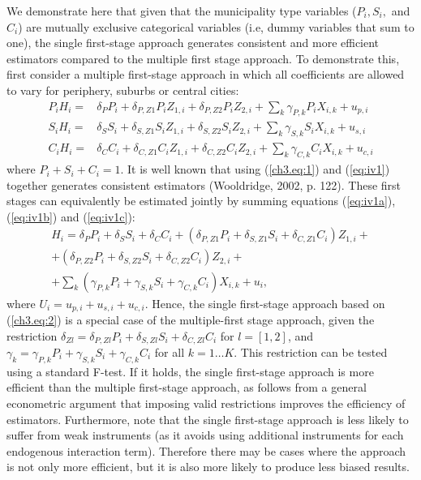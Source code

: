 \documentclass[a4paper,authoryear,review]{elsarticle}  	%
\begin{document}
	We demonstrate here that given that the municipality type variables ($P_{i}, S_{i},$ and $C_{i}$) are mutually exclusive categorical variables (i.e, dummy variables that sum to one), the single first-stage approach generates consistent and more efficient estimators compared to the multiple first stage approach. 	
	To demonstrate this, first consider a multiple first-stage approach in which all coefficients are allowed to vary for periphery, suburbs or central cities: 	
	\begin{subequations}\label{eq:iv1}
		\begin{eqnarray}
		P_{i}H_{i}=&\delta_{P}P_{i} + \delta_{P,Z1}P_{i}Z_{1,i}+ \delta_{P,Z2}P_{i}Z_{2,i} + \sum_{k}\gamma_{P,k} P_{i}X_{i,k} + u_{p,i} \label{eq:iv1a} \\
		S_{i}H_{i}=&\delta_{S}S_{i} + \delta_{S,Z1}S_{i}Z_{1,i}+ \delta_{S,Z2}S_{i}Z_{2,i} + \sum_{k}\gamma_{S,k} S_{i}X_{i,k} + u_{s,i} \label{eq:iv1b} \\
		C_{i}H_{i}=&\delta_{C}C_{i} + \delta_{C,Z1}C_{i}Z_{1,i}+ \delta_{C,Z2}C_{i}Z_{2,i} + \sum_{k}\gamma_{C,k} C_{i}X_{i,k} + u_{c,i} \label{eq:iv1c}			
		\end{eqnarray}
	\end{subequations}
	where $P_{i} + S_{i} + C_{i} = 1$. 
	It is well known that using (\ref{ch3.eq:1}) and (\ref{eq:iv1}) together generates consistent estimators (Wooldridge, 2002, p. 122). %
	These first stages can equivalently be estimated jointly by summing equations (\ref{eq:iv1a}), (\ref{eq:iv1b}) and (\ref{eq:iv1c}):	
	\begin{equation}\label{eq:iv2}
	\begin{split}
	H_{i} =	 \delta_{P}P_{i} + \delta_{S}S_{i} + \delta_{C}C_{i} + 	(\delta_{P,Z1}P_{i} + \delta_{S,Z1}S_{i} + \delta_{C,Z1}C_{i})Z_{1,i} + \\
	+ (\delta_{P,Z2}P_{i} + \delta_{S,Z2}S_{i} + \delta_{C,Z2}C_{i})Z_{2,i} + \\
	+ \sum_{k} (\gamma_{P,k}P_{i} + \gamma_{S,k}S_{i} + \gamma_{C,k}C_{i}) X_{i,k} + u_i ,
	\end{split}
	\end{equation}
	where  $U_i = u_{p,i} + u_{s,i} + u_{c,i}$. Hence, the single first-stage approach based on (\ref{ch3.eq:2}) is a special case of the multiple-first stage approach, given the restriction $\delta_{Zl} = \delta_{P,Zl}P_{i} + \delta_{S,Zl}S_{i} + \delta_{C,Zl}C_{i}$ for $l=[1,2]$, and $ \gamma_{k} = \gamma_{P,k}P_{i} + \gamma_{S,k}S_{i} + \gamma_{C,k}C_{i}$ for all $k=1\ldots K$. This restriction can be tested using a standard F-test. If it holds, the single first-stage approach is more efficient than the multiple first-stage approach, as follows from a general econometric argument that imposing valid restrictions improves the efficiency of estimators. %
	Furthermore, note that the single first-stage approach is less likely to suffer from weak instruments (as it avoids using additional instruments for each endogenous interaction term). Therefore there may be cases where the approach is not only more efficient, but it is also more likely to produce less biased results.
		
\end{document}
